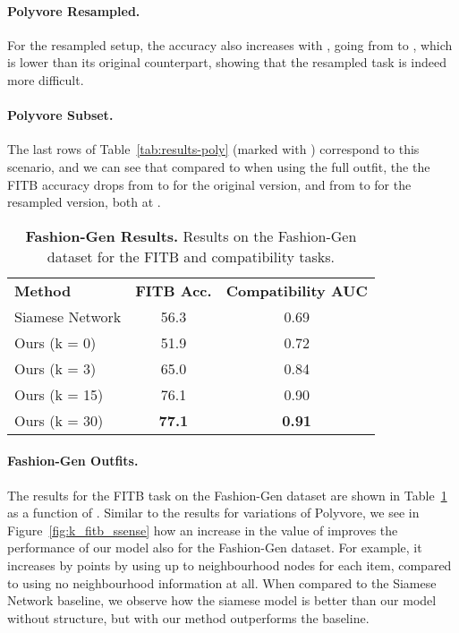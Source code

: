 \documentclass[10pt,twocolumn,letterpaper]{article}
\begin{document}
\paragraph{Polyvore Resampled.} 
For the resampled setup, the accuracy also increases with , going from  to , which is lower than its original counterpart, showing that the resampled task is indeed more difficult.

\paragraph{Polyvore Subset.} 
The last rows of Table~\ref{tab:results-poly} (marked with \textdagger) correspond to this scenario, and we can see that compared to when using the full outfit, the the FITB accuracy drops from  to  for the original version, and from  to  for the resampled version, both at .

\begin{table}[t]
\caption{\textbf{Fashion-Gen Results.} Results on the Fashion-Gen dataset for the FITB and compatibility tasks.}
\vskip-0cm
\label{tab:results-fgen}
\begin{center}
\begin{tabular}{l|cc}
\textbf{Method} & \textbf{FITB Acc.} & \textbf{Compatibility AUC}\\\shline
Siamese Network         & 56.3 &  0.69 \\     
 \hline
Ours (k = 0)            & 51.9 &  0.72  \\
Ours (k = 3)            & 65.0 &  0.84  \\
Ours (k = 15)           & 76.1 &  0.90  \\
Ours (k = 30)           & \textbf{77.1} &  \textbf{0.91}  \\
\end{tabular}
\end{center}
\end{table}

\paragraph{Fashion-Gen Outfits.}


The results for the FITB task on the Fashion-Gen dataset are shown in Table~\ref{tab:results-fgen} as a function of . Similar to the results for variations of Polyvore, we see in Figure~\ref{fig:k_fitb_ssense} how an increase in the value of  improves the performance of our model also for 
the Fashion-Gen dataset. For example, it increases by  points by using up to  neighbourhood nodes for each item, compared to using no neighbourhood information at all. When compared to the Siamese Network baseline, we observe how the siamese model is better than our model without structure, but with  our method outperforms the baseline.
\end{document}
